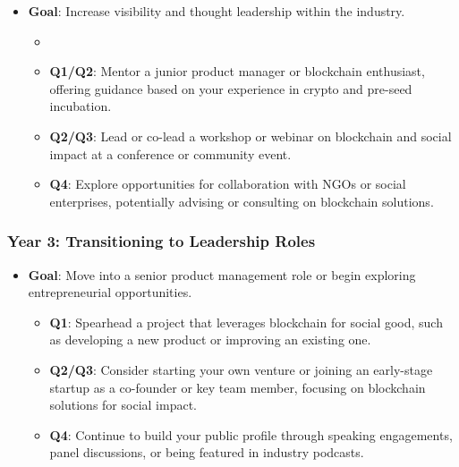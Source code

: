 \begin{itemize}
\tightlist
\item
  \textbf{Goal}: Increase visibility and thought leadership within the
  industry.

  \begin{itemize}
  \tightlist
  \item
  \item
    \textbf{Q1/Q2}: Mentor a junior product manager or blockchain
    enthusiast, offering guidance based on your experience in crypto and
    pre-seed incubation.
  \item
    \textbf{Q2/Q3}: Lead or co-lead a workshop or webinar on blockchain and
    social impact at a conference or community event.
  \item
    \textbf{Q4}: Explore opportunities for collaboration with NGOs or
    social enterprises, potentially advising or consulting on blockchain
    solutions.
  \end{itemize}
\end{itemize}

\hypertarget{year-3-transitioning-to-leadership-roles}{%
\subsubsection*{\texorpdfstring{\textbf{Year 3: Transitioning to
Leadership
Roles}}{Year 3: Transitioning to Leadership Roles}}\label{year-3-transitioning-to-leadership-roles}}

\begin{itemize}
\tightlist
\item
  \textbf{Goal}: Move into a senior product management role or begin
  exploring entrepreneurial opportunities.

  \begin{itemize}
  \tightlist
  \item \textbf{Q1}: Spearhead a project that leverages blockchain for social good, such as developing a new product or improving an existing one.
  \item \textbf{Q2/Q3}: Consider starting your own venture or joining an early-stage startup as a co-founder or key team member, focusing on blockchain solutions for social impact.
  \item
    \textbf{Q4}: Continue to build your public profile through speaking
    engagements, panel discussions, or being featured in industry
    podcasts.
  \end{itemize}
\end{itemize}

